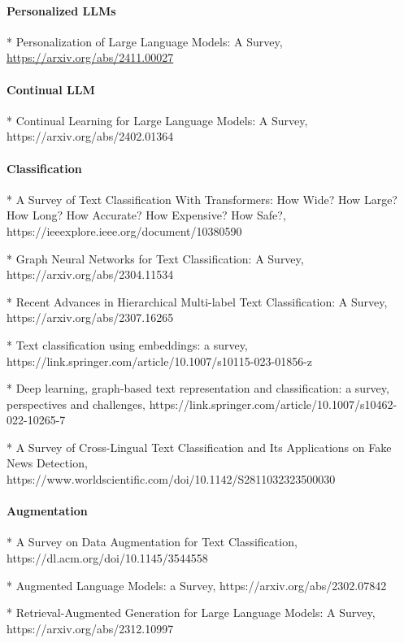 \paragraph{Personalized LLMs}

* Personalization of Large Language Models: A Survey, \url{https://arxiv.org/abs/2411.00027}

\paragraph{Continual LLM}

* Continual Learning for Large Language Models: A Survey, https://arxiv.org/abs/2402.01364

\paragraph{Classification}

* A Survey of Text Classification With Transformers: How Wide? How Large? How Long? How Accurate? How Expensive? How Safe?, https://ieeexplore.ieee.org/document/10380590

* Graph Neural Networks for Text Classification: A Survey, https://arxiv.org/abs/2304.11534

* Recent Advances in Hierarchical Multi-label Text Classification: A Survey, https://arxiv.org/abs/2307.16265

* Text classification using embeddings: a survey, https://link.springer.com/article/10.1007/s10115-023-01856-z

* Deep learning, graph-based text representation and classification: a survey, perspectives and challenges, https://link.springer.com/article/10.1007/s10462-022-10265-7

* A Survey of Cross-Lingual Text Classification and Its Applications on Fake News Detection, https://www.worldscientific.com/doi/10.1142/S2811032323500030

\paragraph{Augmentation}

* A Survey on Data Augmentation for Text Classification, https://dl.acm.org/doi/10.1145/3544558

* Augmented Language Models: a Survey, https://arxiv.org/abs/2302.07842

* Retrieval-Augmented Generation for Large Language Models: A Survey, https://arxiv.org/abs/2312.10997
 

